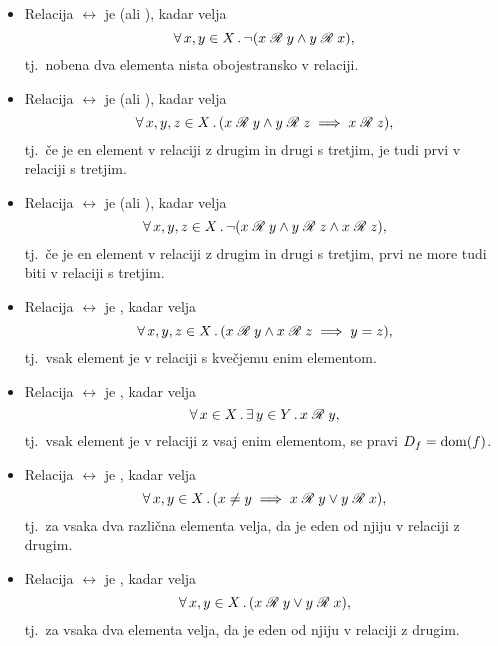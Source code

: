 \begin{definicija}
\begin{itemize}
                                \item
                                        Relacija $\rel$ je  (ali ), kadar velja
                                        \[\xall{x, y}[X]{\lnot(\rel[x][y] \land \rel[y][x])},\]
                                        tj.~nobena dva elementa nista obojestransko v relaciji.
                                \item
                                        Relacija $\rel$ je  (ali ), kadar velja
                                        \[\all{x, y, z}[X]{\rel[x][y] \land \rel[y][z] \implies \rel[x][z]},\]
                                        tj.~če je en element v relaciji z drugim in drugi s tretjim, je tudi prvi v relaciji s tretjim.
                                \item
                                        Relacija $\rel$ je  (ali ), kadar velja
                                        \[\xall{x, y, z}[X]{\lnot(\rel[x][y] \land \rel[y][z] \land \rel[x][z])},\]
                                        tj.~če je en element v relaciji z drugim in drugi s tretjim, prvi ne more tudi biti v relaciji s tretjim.
                                \item
                                        Relacija $\rel$ je , kadar velja
                                        \[\all{x, y, z}[X]{\rel[x][y] \land \rel[x][z] \implies y = z},\]
                                        tj.~vsak element je v relaciji s kvečjemu enim elementom.
                                \item
                                        Relacija $\rel$ je , kadar velja
                                        \[\xall{x}[X]{\xsome{y}[Y]{\rel[x][y]}},\]
                                        tj.~vsak element je v relaciji z vsaj enim elementom, se pravi $D_{f} = \mathrm{dom}(f)$.
                                \item
                                        Relacija $\rel$ je , kadar velja
                                        \[\all{x, y}[X]{x \neq y \implies \rel[x][y] \lor \rel[y][x]},\]
                                        tj.~za vsaka dva različna elementa velja, da je eden od njiju v relaciji z drugim.
                                \item
                                        Relacija $\rel$ je , kadar velja
                                        \[\all{x, y}[X]{\rel[x][y] \lor \rel[y][x]},\]
                                        tj.~za vsaka dva elementa velja, da je eden od njiju v relaciji z drugim.
                        \end{itemize}
                \end{definicija}


